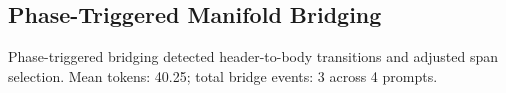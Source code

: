 \subsection{Phase-Triggered Manifold Bridging}
Phase-triggered bridging detected header-to-body transitions and adjusted span selection.
Mean tokens: 40.25; total bridge events: 3 across 4 prompts.
